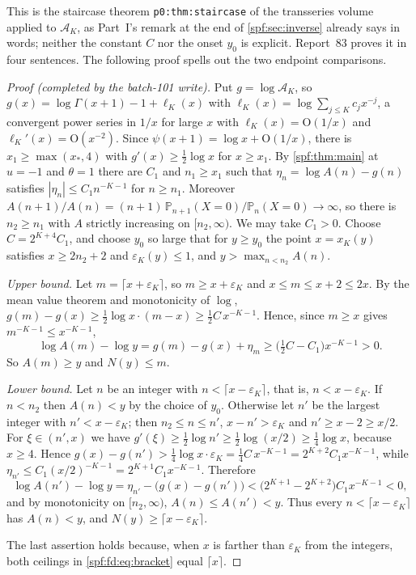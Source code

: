 \documentclass[11pt]{article}
\numberwithin{equation}{section}
\theoremstyle{definition}
\theoremstyle{remark}
\theoremstyle{definition}
\newcommand{\Pp}{\mathbb P}
\newcommand{\bigO}{\mathrm O}
\begin{document}
This is the staircase theorem \texttt{p0:thm:staircase} of the transseries
volume~\cite{tai} applied to $\mathcal A_K$, as Part~I's remark at the end of
\cref{spf:sec:inverse} already says in words; neither the constant $C$ nor
the onset $y_0$ is explicit. Report~83 proves it in four sentences. The
following proof spells out the two endpoint comparisons.

\begin{proof}[Proof (completed by the batch-101 write)]
Put $g=\log\mathcal A_K$, so $g(x)=\log\Gamma(x+1)-1+\ell_K(x)$ with
$\ell_K(x)=\log\sum_{j\le K}c_jx^{-j}$, a convergent power series in $1/x$
for large $x$ with $\ell_K(x)=\bigO(1/x)$ and $\ell_K'(x)=\bigO(x^{-2})$.
Since $\psi(x+1)=\log x+\bigO(1/x)$, there is $x_1\ge\max(x_*,4)$ with
$g'(x)\ge\frac12\log x$ for $x\ge x_1$. By \cref{spf:thm:main} at $u=-1$ and
$\theta=1$ there are $C_1$ and $n_1\ge x_1$ such that
$\eta_n=\log A(n)-g(n)$ satisfies $|\eta_n|\le C_1n^{-K-1}$ for $n\ge n_1$.
Moreover $A(n+1)/A(n)=(n+1)\,\Pp_{n+1}(X=0)/\Pp_n(X=0)\to\infty$, so there
is $n_2\ge n_1$ with $A$ strictly increasing on $[n_2,\infty)$. We may take
$C_1>0$. Choose $C=2^{K+4}C_1$, and choose $y_0$ so large that for
$y\ge y_0$ the point $x=x_K(y)$ satisfies $x\ge 2n_2+2$ and
$\varepsilon_K(y)\le1$, and $y>\max_{n<n_2}A(n)$.

\emph{Upper bound.} Let $m=\lceil x+\varepsilon_K\rceil$, so
$m\ge x+\varepsilon_K$ and $x\le m\le x+2\le 2x$. By the mean value theorem
and monotonicity of $\log$,
$g(m)-g(x)\ge\frac12\log x\cdot(m-x)\ge\frac12C\,x^{-K-1}$. Hence, since
$m\ge x$ gives $m^{-K-1}\le x^{-K-1}$,
\[
 \log A(m)-\log y=g(m)-g(x)+\eta_m\ge\bigl(\tfrac12C-C_1\bigr)x^{-K-1}>0 .
\]
So $A(m)\ge y$ and $N(y)\le m$.

\emph{Lower bound.} Let $n$ be an integer with
$n<\lceil x-\varepsilon_K\rceil$, that is, $n<x-\varepsilon_K$. If $n<n_2$
then $A(n)<y$ by the choice of $y_0$. Otherwise let $n'$ be the largest
integer with $n'<x-\varepsilon_K$; then $n_2\le n\le n'$, $x-n'>\varepsilon_K$
and $n'\ge x-2\ge x/2$. For $\xi\in(n',x)$ we have
$g'(\xi)\ge\frac12\log n'\ge\frac12\log(x/2)\ge\frac14\log x$, because
$x\ge4$. Hence $g(x)-g(n')>\frac14\log x\cdot\varepsilon_K=\frac14C\,x^{-K-1}
=2^{K+2}C_1x^{-K-1}$, while $\eta_{n'}\le C_1(x/2)^{-K-1}=2^{K+1}C_1x^{-K-1}$.
Therefore
\[
 \log A(n')-\log y=\eta_{n'}-\bigl(g(x)-g(n')\bigr)
 <\bigl(2^{K+1}-2^{K+2}\bigr)C_1x^{-K-1}<0,
\]
and by monotonicity on $[n_2,\infty)$, $A(n)\le A(n')<y$. Thus every
$n<\lceil x-\varepsilon_K\rceil$ has $A(n)<y$, and
$N(y)\ge\lceil x-\varepsilon_K\rceil$.

The last assertion holds because, when $x$ is farther than $\varepsilon_K$
from the integers, both ceilings in \eqref{spf:fd:eq:bracket} equal
$\lceil x\rceil$.
\end{proof}
\end{document}
